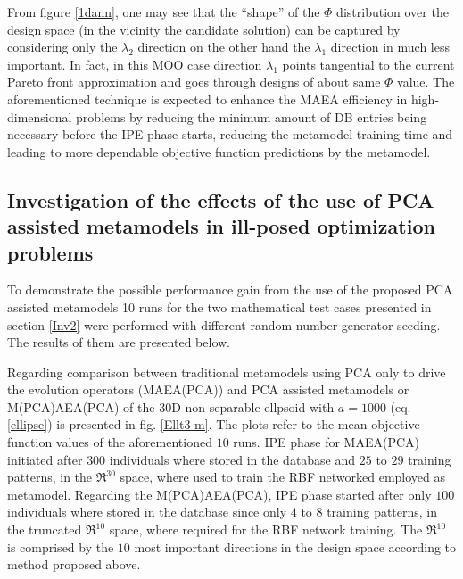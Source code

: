 From figure \ref{1dann}, one may see that the ``shape'' of the $\Phi$ distribution over the design space (in the vicinity the candidate solution) can be captured by considering only the $\lambda_2$ direction on the other hand the $\lambda_1$ direction in much less important. In fact, in this MOO case direction $\lambda_1$ points tangential to the current Pareto front approximation and goes through designs of about  same $\Phi$ value. The aforementioned technique is expected to enhance the MAEA efficiency in high-dimensional problems by reducing the minimum amount of DB entries being necessary before the IPE phase starts, reducing the metamodel training time and leading to more dependable objective function predictions by the metamodel.     

\subsection{Investigation of the effects of the use of PCA assisted metamodels in ill-posed optimization problems}

To demonstrate the possible performance gain from the use of the proposed PCA assisted metamodels 10 runs for the two mathematical test cases presented in section \ref{Inv2} were performed with different random number generator seeding. The results of them are presented below. 

Regarding comparison between traditional metamodels using PCA only to drive the evolution operators (MAEA(PCA)) and PCA assisted metamodels  or M(PCA)AEA(PCA) of the 30D non-separable ellpsoid with $a=1000$ (eq. \ref{ellipse}) is presented in fig. \ref{Ellt3-m}. The plots refer to the mean objective function values of the aforementioned $10$ runs. IPE phase for MAEA(PCA) initiated after $300$ individuals where stored in the database and $25$ to $29$ training patterns, in the $\Re^{30}$ space, where used to train the RBF networked employed as metamodel. Regarding the M(PCA)AEA(PCA), IPE phase started after only $100$ individuals where stored in the database since only $4$ to $8$ training patterns, in the truncated  $\Re^{10}$  space, where required for the RBF network training. The $\Re^{10}$ is comprised by the $10$ most important directions in the design space according to method proposed above. 

